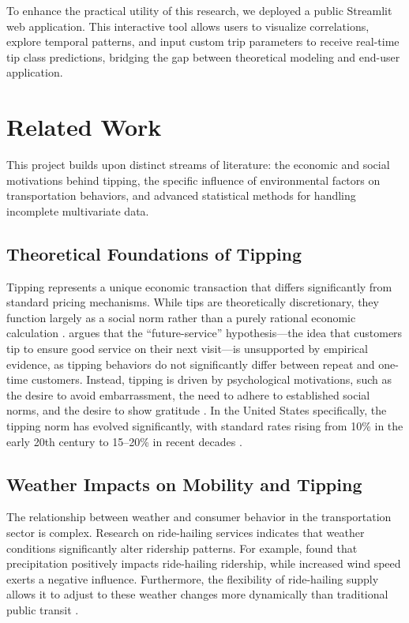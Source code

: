 \documentclass[11pt]{article}
\begin{document}
To enhance the practical utility of this research, we deployed a public Streamlit web application. This interactive tool allows users to visualize correlations, explore temporal patterns, and input custom trip parameters to receive real-time tip class predictions, bridging the gap between theoretical modeling and end-user application.


\section{Related Work}
This project builds upon distinct streams of literature: the economic and social motivations behind tipping, the specific influence of environmental factors on transportation behaviors, and advanced statistical methods for handling incomplete multivariate data.

\subsection{Theoretical Foundations of Tipping}
Tipping represents a unique economic transaction that differs significantly from standard pricing mechanisms. While tips are theoretically discretionary, they function largely as a social norm rather than a purely rational economic calculation \citep{azar2020economics}. \citet{azar2020economics} argues that the ``future-service'' hypothesis---the idea that customers tip to ensure good service on their next visit---is unsupported by empirical evidence, as tipping behaviors do not significantly differ between repeat and one-time customers. Instead, tipping is driven by psychological motivations, such as the desire to avoid embarrassment, the need to adhere to established social norms, and the desire to show gratitude \citep{azar2020economics}. In the United States specifically, the tipping norm has evolved significantly, with standard rates rising from 10\% in the early 20th century to 15--20\% in recent decades \citep{azar2020economics}.

\subsection{Weather Impacts on Mobility and Tipping}
The relationship between weather and consumer behavior in the transportation sector is complex. Research on ride-hailing services indicates that weather conditions significantly alter ridership patterns. For example, \citet{LIU2021257} found that precipitation positively impacts ride-hailing ridership, while increased wind speed exerts a negative influence. Furthermore, the flexibility of ride-hailing supply allows it to adjust to these weather changes more dynamically than traditional public transit \citep{LIU2021257}.
\end{document}

